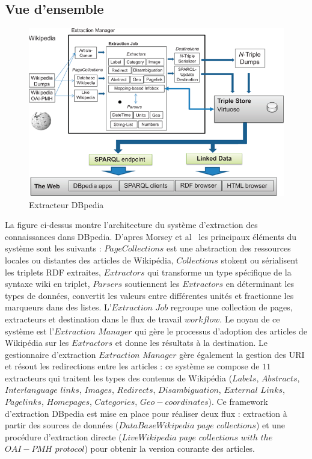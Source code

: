 \documentclass[12pt,a4	]{report}
\begin{document}
\subsection{Vue d'ensemble}
\begin{figure}[H]
\centering
\includegraphics[width=12cm]{dbpediaExtra.png}
\caption{Extracteur DBpedia}
\end{figure}
La figure ci-dessus montre l'architecture du système d'extraction des connaissances dans DBpedia.
D'apres Morsey et al~\cite{morsey2012} les principaux éléments du système sont les suivants : $PageCollections$ est une abstraction des ressources locales ou distantes des articles de Wikipédia, $Collections$ stokent ou sérialisent les triplets RDF extraites, $Extractors$ qui transforme un type spécifique de la syntaxe wiki en triplet, $Parsers$ soutiennent les $Extractors$ en déterminant les types de données, convertit les valeurs entre différentes unités et fractionne les marqueurs dans des listes. L'$Extraction$ $Job$ regroupe une collection de pages, extracteurs et destination dans le flux de travail $workflow$.
Le noyau de ce système est l'$Extraction$ $Manager$ qui gère le processus  d'adoption des articles de Wikipédia sur les $Extractors$ et donne les résultats à la destination.
Le gestionnaire d'extraction $Extraction$ $Manager$ gère également la gestion des URI et résout les redirections entre les articles : ce système se compose de $11$ extracteurs qui traitent les types des contenus de Wikipédia ($Labels$, $Abstracts$, $Interlanguage$ $links$, $Images$, $Redirects$, $Disambiguation$,
$External$ $Links$, $Pagelinks$, $Homepages$, $Categories$, $Geo-coordinates$).
Ce framework d'extraction DBpedia est mise en place pour réaliser deux flux : extraction à partir des sources de données ($DataBaseWikipedia$ $page$ $collections$) et une procédure d'extraction directe
($LiveWikipedia$ $page$ $collections$ $with$ $the$ $OAI-PMH$ $protocol$) pour obtenir la version courante des articles.
\end{document}
